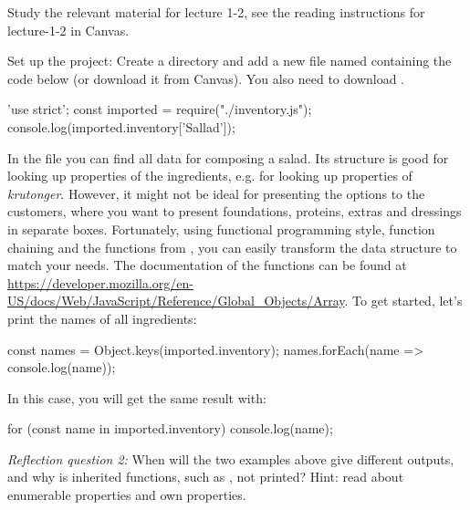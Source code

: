 \documentclass[fleqn, article, a4paper]{memoir}
\begin{document}
\begin{Assignments}

\item Study the relevant material for lecture 1-2, see the reading instructions for lecture-1-2 in Canvas. 


\item %
Set up the project: Create a directory and add a new file named  containing the code below (or download it from Canvas). You also need to download .
\begin{Code}
'use strict';
const imported = require("./inventory.js");
console.log(imported.inventory['Sallad']);
\end{Code}



\item In the  file you can find all data for composing a salad. Its structure is good for looking up properties of the ingredients, e.g.  for looking up properties of \emph{krutonger}. However, it might not be ideal for presenting the options to the customers, where you want to present foundations, proteins, extras and dressings in separate boxes. Fortunately, using functional programming style, function chaining and the functions from , you can easily transform the data structure to match your needs. The documentation of the functions can be found at \url{https://developer.mozilla.org/en-US/docs/Web/JavaScript/Reference/Global_Objects/Array}. To get started, let's print the names of all ingredients:
\begin{Code}
const names = Object.keys(imported.inventory);
names.forEach(name => console.log(name));
\end{Code}
In this case, you will get the same result with:
\begin{Code}
for (const name in imported.inventory) {
  console.log(name);
}
\end{Code}
\emph{Reflection question 2:} When will the two examples above give different outputs, and why is inherited functions, such as , not printed? Hint: read about enumerable properties and own properties.


\end{Assignments}
\end{document}
